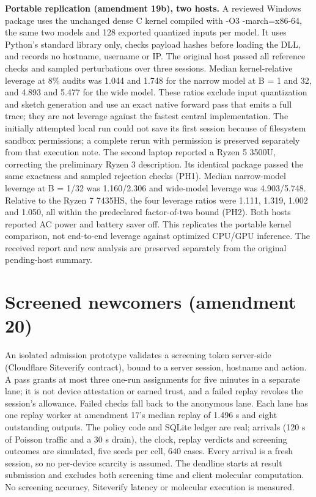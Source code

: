 \documentclass[11pt]{article}
\begin{document}
\textbf{Portable replication (amendment 19b), two hosts.} A reviewed Windows package uses the unchanged dense C kernel compiled with -O3 -march=x86-64, the same two models and 128 exported quantized inputs per model. It uses Python's standard library only, checks payload hashes before loading the DLL, and records no hostname, username or IP. The original host passed all reference checks and sampled perturbations over three sessions. Median kernel-relative leverage at 8\% audits was 1.044 and 1.748 for the narrow model at B = 1 and 32, and 4.893 and 5.477 for the wide model. These ratios exclude input quantization and sketch generation and use an exact native forward pass that emits a full trace; they are not leverage against the fastest central implementation. The initially attempted local run could not save its first session because of filesystem sandbox permissions; a complete rerun with permission is preserved separately from that execution note. The second laptop reported a Ryzen 5 3500U, correcting the preliminary Ryzen 3 description. Its identical package passed the same exactness and sampled rejection checks (PH1). Median narrow-model leverage at B = 1/32 was 1.160/2.306 and wide-model leverage was 4.903/5.748. Relative to the Ryzen 7 7435HS, the four leverage ratios were 1.111, 1.319, 1.002 and 1.050, all within the predeclared factor-of-two bound (PH2). Both hosts reported AC power and battery saver off. This replicates the portable kernel comparison, not end-to-end leverage against optimized CPU/GPU inference. The received report and new analysis are preserved separately from the original pending-host summary.

\section{Screened newcomers (amendment 20)}

An isolated admission prototype validates a screening token server-side (Cloudflare Siteverify contract), bound to a server session, hostname and action. A pass grants at most three one-run assignments for five minutes in a separate lane; it is not device attestation or earned trust, and a failed replay revokes the session's allowance. Failed checks fall back to the anonymous lane. Each lane has one replay worker at amendment 17's median replay of 1.496 s and eight outstanding outputs. The policy code and SQLite ledger are real; arrivals (120 s of Poisson traffic and a 30 s drain), the clock, replay verdicts and screening outcomes are simulated, five seeds per cell, 640 cases. Every arrival is a fresh session, so no per-device scarcity is assumed. The deadline starts at result submission and excludes both screening time and client molecular computation. No screening accuracy, Siteverify latency or molecular execution is measured.
\end{document}

